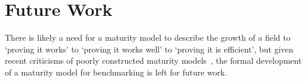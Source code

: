 \section{Future Work}
\label{section:51-Future-Work}

There is likely a need for a maturity model to describe the growth of a field to `proving it works' to `proving it works well' to `proving it is efficient', but given recent criticisms of poorly constructed maturity models~\cite{Lahrmann2011, Sadiq2021}, the formal development of a maturity model for benchmarking is left for future work. 